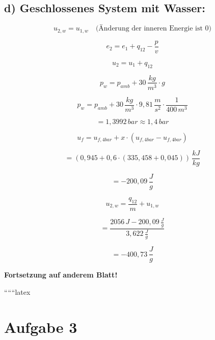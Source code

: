 \subsection*{d) Geschlossenes System mit Wasser:}

\[
u_{2,w} = u_{1,w} \quad \text{(Änderung der inneren Energie ist 0)}
\]

\[
e_2 = e_1 + q_{12} - \frac{p}{v}
\]

\[
u_2 = u_1 + q_{12}
\]

\[
p_w = p_{amb} + 30 \, \frac{kg}{m^3} \cdot g
\]

\[
p_w = p_{amb} + 30 \, \frac{kg}{m^3} \cdot 9,81 \, \frac{m}{s^2} \cdot \frac{1}{400 \, m^3}
\]

\[
= 1,3992 \, bar \approx 1,4 \, bar
\]

\[
u_f = u_{f,4bar} + x \cdot (u_{f,4bar} - u_{f,4bar})
\]

\[
= (0,945 + 0,6 \cdot (335,458 + 0,045)) \, \frac{kJ}{kg}
\]

\[
= -200,09 \, \frac{J}{g}
\]

\[
u_{2,w} = \frac{q_{12}}{m} + u_{1,w}
\]

\[
= \frac{2056 \, J - 200,09 \, \frac{J}{g}}{3,622 \, \frac{J}{g}}
\]

\[
= -400,73 \, \frac{J}{g}
\]

\textbf{Fortsetzung auf anderem Blatt!}

``````latex


\section*{Aufgabe 3}